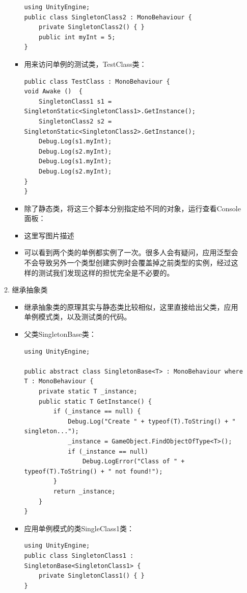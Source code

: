 \documentclass[9pt, b5paper]{article}
\begin{document}
\begin{enumerate}
\begin{enumerate}
\begin{itemize}
\begin{verbatim}
using UnityEngine;
public class SingletonClass2 : MonoBehaviour {
    private SingletonClass2() { }
    public int myInt = 5;
}
\end{verbatim}
\item 用来访问单例的测试类，TestClass类：
\begin{verbatim}
public class TestClass : MonoBehaviour {
void Awake ()  {
    SingletonClass1 s1 = SingletonStatic<SingletonClass1>.GetInstance();
    SingletonClass2 s2 = SingletonStatic<SingletonClass2>.GetInstance();
    Debug.Log(s1.myInt);
    Debug.Log(s2.myInt);
    Debug.Log(s1.myInt);
    Debug.Log(s2.myInt);
}
}
\end{verbatim}
\item 除了静态类，将这三个脚本分别指定给不同的对象，运行查看Console面板：
\item 这里写图片描述
\item 可以看到两个类的单例都实例了一次。很多人会有疑问，应用泛型会不会导致另外一个类型创建实例时会覆盖掉之前类型的实例，经过这样的测试我们发现这样的担忧完全是不必要的。
\end{itemize}
\item 继承抽象类
\label{sec:orgeb76e3f}
\begin{itemize}
\item 继承抽象类的原理其实与静态类比较相似，这里直接给出父类，应用单例模式类，以及测试类的代码。
\item 父类SingletonBase类：
\begin{verbatim}
using UnityEngine;

public abstract class SingletonBase<T> : MonoBehaviour where T : MonoBehaviour {
    private static T _instance;
    public static T GetInstance() {
        if (_instance == null) {
            Debug.Log("Create " + typeof(T).ToString() + " singleton...");
            _instance = GameObject.FindObjectOfType<T>();
            if (_instance == null)
                Debug.LogError("Class of " + typeof(T).ToString() + " not found!");
        }
        return _instance;
    }
}
\end{verbatim}
\item 应用单例模式的类SingleClass1类：
\begin{verbatim}
using UnityEngine;
public class SingletonClass1 : SingletonBase<SingletonClass1> {
    private SingletonClass1() { }
}


\end{verbatim}
\end{itemize}
\end{enumerate}
\end{enumerate}
\end{document}
